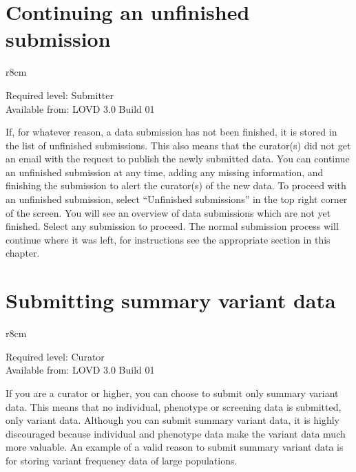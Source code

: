 \hypertarget{sec:interrupted_submission}{}
\section{Continuing an unfinished submission}
\begin{wrapfigure}[3]{r}{8cm} %
  \vspace{-25pt}
  \begin{leftbar}
    Required level: Submitter\\
    Available from: LOVD 3.0 Build 01
  \end{leftbar}
\end{wrapfigure}
If, for whatever reason, a data submission has not been finished, it is stored in the list of unfinished submissions.
This also means that the curator(s) did not get an email with the request to publish the newly submitted data.
You can continue an unfinished submission at any time, adding any missing information,
 and finishing the submission to alert the curator(s) of the new data.
To proceed with an unfinished submission, select ``Unfinished submissions'' in the top right corner of the screen.
You will see an overview of data submissions which are not yet finished.
Select any submission to proceed.
The normal submission process will continue where it was left, for instructions
 see the appropriate section in this chapter.





\section{Submitting summary variant data}
\label{sec:submit_summary_variant_data}
\begin{wrapfigure}[3]{r}{8cm} %
  \vspace{-25pt}
  \begin{leftbar}
    Required level: Curator\\
    Available from: LOVD 3.0 Build 01
  \end{leftbar}
\end{wrapfigure}
If you are a curator or higher, you can choose to submit only summary variant data.
This means that no individual, phenotype or screening data is submitted, only variant data.
Although you can submit summary variant data, it is highly discouraged because individual and phenotype
 data make the variant data much more valuable.
An example of a valid reason to submit summary variant data is for storing variant frequency data of large populations.





